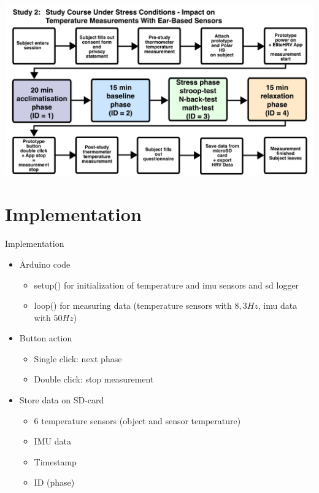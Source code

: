 \documentclass[en]{sdqbeamer}
\begin{document}
\begin{frame}
    \begin{center}
        \includegraphics[width=0.9\linewidth]{../thesis-doc/images/study2/Procedure2.pdf} %
    \end{center}
\end{frame}

\section{Implementation}

\begin{frame}{Implementation}
    \begin{itemize}
        \item Arduino code
        \begin{itemize}
            \item setup() for initialization of temperature and imu sensors and sd logger
            \item loop() for measuring data (temperature sensors with $8,3Hz$, imu data with $50Hz$)
        \end{itemize}
        \item Button action
        \begin{itemize}
            \item Single click: next phase
            \item Double click: stop measurement
        \end{itemize}
        \item Store data on SD-card
        \begin{itemize}
            \item 6 temperature sensors (object and sensor temperature)
            \item IMU data
            \item Timestamp
            \item ID (phase)
        \end{itemize}
    \end{itemize}
\end{frame}
\end{document}
